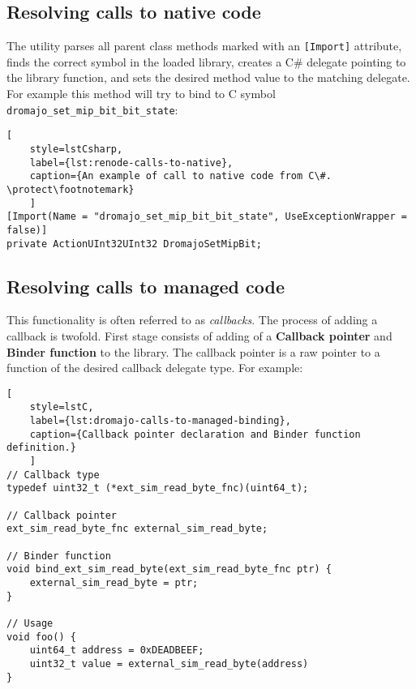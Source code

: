 \subsection*{Resolving calls to native code}

The utility parses all parent class methods marked with an \texttt{[Import]} attribute, finds the correct symbol in the
loaded library, creates a C\# delegate pointing to the library function, and sets the desired method value to the
matching delegate. For example this method will try to bind to C symbol \texttt{dromajo\_set\_mip\_bit\_bit\_state}:

\begin{lstlisting}[
    style=lstCsharp,
    label={lst:renode-calls-to-native},
    caption={An example of call to native code from C\#. \protect\footnotemark}
    ]
[Import(Name = "dromajo_set_mip_bit_bit_state", UseExceptionWrapper = false)]
private ActionUInt32UInt32 DromajoSetMipBit;
\end{lstlisting}


\subsection*{Resolving calls to managed code}

This functionality is often referred to as \textit{callbacks}. The process of adding a callback is twofold. First stage
consists of adding of a \textbf{Callback pointer} and \textbf{Binder function} to the library. The callback pointer
is a raw pointer to a function of the desired callback delegate type. For example:

\begin{lstlisting}[
    style=lstC,
    label={lst:dromajo-calls-to-managed-binding},
    caption={Callback pointer declaration and Binder function definition.}
    ]
// Callback type
typedef uint32_t (*ext_sim_read_byte_fnc)(uint64_t);

// Callback pointer
ext_sim_read_byte_fnc external_sim_read_byte;

// Binder function
void bind_ext_sim_read_byte(ext_sim_read_byte_fnc ptr) {
    external_sim_read_byte = ptr;
}

// Usage
void foo() {
    uint64_t address = 0xDEADBEEF;
    uint32_t value = external_sim_read_byte(address)
}
\end{lstlisting}


